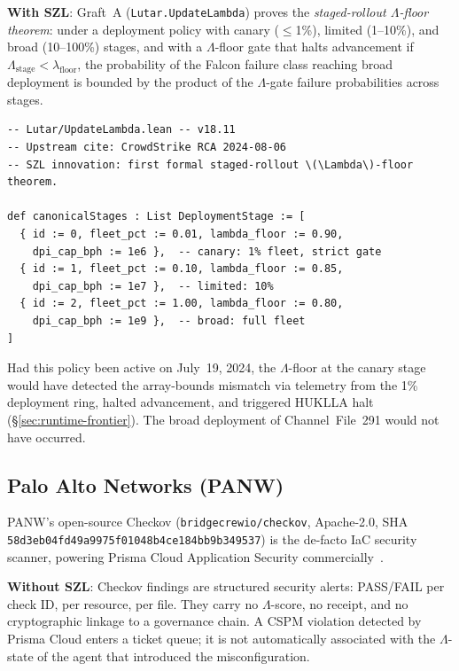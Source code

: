 \textbf{With SZL}: Graft~A (\texttt{Lutar.UpdateLambda}) proves the
\emph{staged-rollout $\Lambda$-floor theorem}: under a deployment policy
with canary ($\leq$1\%), limited (1--10\%), and broad (10--100\%) stages,
and with a $\Lambda$-floor gate that halts advancement if
$\Lambda_{\mathrm{stage}} < \lambda_{\mathrm{floor}}$, the probability of
the Falcon failure class reaching broad deployment is bounded by the product
of the $\Lambda$-gate failure probabilities across stages.

\begin{lstlisting}[language=lean, caption={Canonical staged rollout
  definition from \texttt{Lutar.UpdateLambda}}, label={lst:staged-rollout}]
-- Lutar/UpdateLambda.lean -- v18.11
-- Upstream cite: CrowdStrike RCA 2024-08-06
-- SZL innovation: first formal staged-rollout \(\Lambda\)-floor theorem.

def canonicalStages : List DeploymentStage := [
  { id := 0, fleet_pct := 0.01, lambda_floor := 0.90,
    dpi_cap_bph := 1e6 },  -- canary: 1% fleet, strict gate
  { id := 1, fleet_pct := 0.10, lambda_floor := 0.85,
    dpi_cap_bph := 1e7 },  -- limited: 10%
  { id := 2, fleet_pct := 1.00, lambda_floor := 0.80,
    dpi_cap_bph := 1e9 },  -- broad: full fleet
]
\end{lstlisting}

Had this policy been active on July~19, 2024, the $\Lambda$-floor at the
canary stage would have detected the array-bounds mismatch via telemetry
from the 1\% deployment ring, halted advancement, and triggered HUKLLA halt
(\S\ref{sec:runtime-frontier}).  The broad deployment of Channel~File~291
would not have occurred.

\subsection{Palo Alto Networks (PANW)}
\label{ssec:panw}

PANW's open-source Checkov (\texttt{bridgecrewio/checkov}, Apache-2.0,
SHA \texttt{58d3eb04fd49a9975f01048b4ce184bb9b349537}) is the de-facto
IaC security scanner, powering Prisma Cloud Application Security
commercially~\cite{szl_paloalto_graft}.

\textbf{Without SZL}: Checkov findings are structured security alerts:
PASS/FAIL per check ID, per resource, per file.  They carry no $\Lambda$-score,
no receipt, and no cryptographic linkage to a governance chain.  A CSPM
violation detected by Prisma Cloud enters a ticket queue; it is not
automatically associated with the $\Lambda$-state of the agent that
introduced the misconfiguration.

